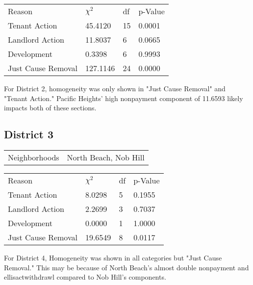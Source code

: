 \documentclass[]{article}
\begin{document}
\begin {table}[!h]
\centering
\begin{tabular}{l | l | l | l}
	
	Reason	&  $\chi ^{2}$ & df & p-Value \\
	Tenant Action 		 & 45.4120 &  15   & 0.0001 		\\
	Landlord Action	     & 11.8037 &  6     &  	0.0665	\\
	Development			 & 0.3398 &  6    &  0.9993		\\
	Just Cause Removal	 & 127.1146   &  24 &  	0.0000		\\
\end{tabular} \newline
\end{table}
\FloatBarrier

For District 2, homogeneity was only shown in "Just Cause Removal" and "Tenant Action." Pacific Heights' high nonpayment component of 11.6593 likely impacts both of these sections.

\subsection{District 3}

\begin{table}[!h]
	\centering
	\begin{tabular}{l | l}
		Neighborhoods & North Beach, Nob Hill \\
	\end{tabular}
\end{table}
\FloatBarrier

\begin {table}[!h]
\centering
\begin{tabular}{l | l | l | l}
	
	Reason	&  $\chi ^{2}$ & df & p-Value \\
	Tenant Action 		  & 8.0298 &  5  &  0.1955    \\
	Landlord Action	      & 2.2699 &  3  &  0.7037    \\
	Development			  & 0.0000 &  1  &  1.0000    \\
	Just Cause Removal	  & 19.6549 &  8  &  0.0117    \\
\end{tabular} \newline
\end{table}
\FloatBarrier

For District 4, Homogeneity was shown in all categories but "Just Cause Removal." This may be because of North Beach's almost double nonpayment and ellisactwithdrawl compared to Nob Hill's components.
\end{document}
